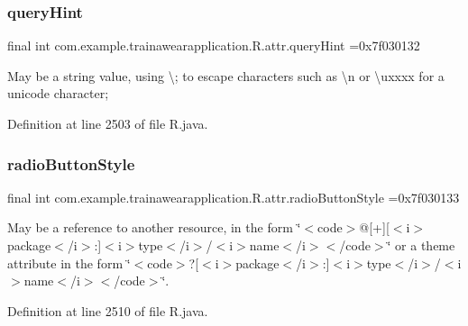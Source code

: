 \subsubsection{\texorpdfstring{queryHint}{queryHint}}
{\footnotesize\ttfamily final int com.\+example.\+trainawearapplication.\+R.\+attr.\+query\+Hint =0x7f030132\hspace{0.3cm}{\ttfamily [static]}}

May be a string value, using \textquotesingle{}\textbackslash{};\textquotesingle{} to escape characters such as \textquotesingle{}\textbackslash{}n\textquotesingle{} or \textquotesingle{}\textbackslash{}uxxxx\textquotesingle{} for a unicode character; 

Definition at line 2503 of file R.\+java.

\mbox{\label{classcom_1_1example_1_1trainawearapplication_1_1_r_1_1attr_a8dada23e929aac4868c3483a74a0b2f2}} 
\subsubsection{\texorpdfstring{radioButtonStyle}{radioButtonStyle}}
{\footnotesize\ttfamily final int com.\+example.\+trainawearapplication.\+R.\+attr.\+radio\+Button\+Style =0x7f030133\hspace{0.3cm}{\ttfamily [static]}}

May be a reference to another resource, in the form \char`\"{}$<$code$>$@\mbox{[}+\mbox{]}\mbox{[}$<$i$>$package$<$/i$>$\+:\mbox{]}$<$i$>$type$<$/i$>$/$<$i$>$name$<$/i$>$$<$/code$>$\char`\"{} or a theme attribute in the form \char`\"{}$<$code$>$?\mbox{[}$<$i$>$package$<$/i$>$\+:\mbox{]}$<$i$>$type$<$/i$>$/$<$i$>$name$<$/i$>$$<$/code$>$\char`\"{}. 

Definition at line 2510 of file R.\+java.

\mbox{\label{classcom_1_1example_1_1trainawearapplication_1_1_r_1_1attr_a58db5dad031fefba36b1b4428ef6bbee}} 
